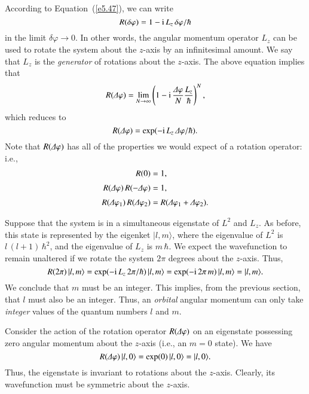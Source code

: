 According to Equation~(\ref{e5.47}), we can write
\begin{equation}
R(\delta \varphi) = 1 -{\rm i}\,L_z\,\delta\varphi/\hbar
\end{equation}
in the limit $\delta\varphi\rightarrow 0$. In other words, the angular momentum 
operator $L_z$
can be used to rotate the system about the $z$-axis by an infinitesimal amount.
We say that $L_z$ is the {\em generator}\/ of rotations about the $z$-axis. 
The above equation implies that 
\begin{equation}
R({\mit\Delta}\varphi) = \lim_{N\rightarrow\infty} \left(1-{\rm i} \,\frac{{\mit\Delta}
\varphi}{N} \frac{L_z}{\hbar}\right)^N,
\end{equation}
which reduces to
\begin{equation}\label{e5.50}
R({\mit\Delta}\varphi) = \exp(-{\rm i}\,L_z \,{\mit\Delta}\varphi/\hbar).
\end{equation}
Note that $R({\mit\Delta}\varphi)$ has all of the properties we would expect of
a rotation operator: i.e., 
\begin{align}
R(0) &= 1,\\[0.5ex]
R({\mit\Delta}\varphi)\,R(-{\mit\Delta}\varphi) &= 1,\\[0.5ex]
R({\mit\Delta}\varphi_1)\,R({\mit\Delta}\varphi_2)& = R({\mit\Delta}\varphi_1+ {\mit\Delta}\varphi_2).
\end{align}

Suppose that the system is in a simultaneous eigenstate of $L^2$ and $L_z$. 
As before, this state is represented by the eigenket $|l,m\rangle$, where
the eigenvalue of $L^2$ is $l\,(l+1)\,\hbar^2$, and
the eigenvalue of $L_z$ is $m\,\hbar$.  We expect the wavefunction
 to remain unaltered  if we rotate
the system $2\pi$ degrees about the $z$-axis. Thus,
\begin{equation}
R(2\pi)\,|l,m\rangle = \exp(-{\rm i}\,L_z \,2\pi/\hbar)\,|l,m\rangle 
= \exp(-{\rm i}\, 2\pi\,m) \,|l,m\rangle = |l,m\rangle.
\end{equation}
We conclude that $m$ must be an integer. This implies, from the previous
section, that $l$ must also be an integer. Thus, an {\em orbital}\/ angular momentum
can only take  {\em integer}\/ values of the quantum numbers $l$ and $m$. 

Consider the action of the rotation operator $R({\mit\Delta}\varphi)$ on an eigenstate
possessing zero angular momentum about the $z$-axis ({\rm i.e.}, an $m=0$
state). We have
\begin{equation}
R({\mit\Delta}\varphi)\,|l, 0\rangle =  \exp(0)\,| l, 0\rangle = |l, 0\rangle.
\end{equation}
Thus, the eigenstate is invariant to rotations about the $z$-axis. Clearly,
its wavefunction must be symmetric about the $z$-axis. 

